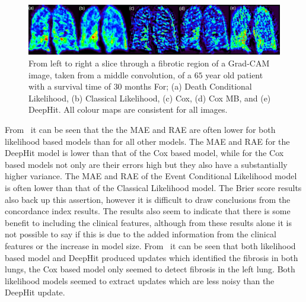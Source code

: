     \begin{figure}
        
        \centering

        \includegraphics[width=1.0\linewidth]{Figures/grad_cam_label.png}
        
        \vspace{-0.25cm}
        
        \captionsetup{singlelinecheck=false, justification=centering}
        \caption{
            \scriptsize
            From left to right a slice through a fibrotic region of a Grad-CAM image, taken from a middle convolution, of a $65$ year old patient with a survival time of $30$ months For; (a) Death Conditional Likelihood, (b) Classical Likelihood, (c) Cox, (d) Cox \gls{MB}, and (e) DeepHit. All colour maps are consistent for all images.
        }
        \label{fig:grad_cam}
        
       \vspace{-0.5cm}
   \end{figure}

    From~ it can be seen that the the \gls{MAE} and \gls{RAE} are often lower for both likelihood based models than for all other models. The \gls{MAE} and \gls{RAE} for the DeepHit model is lower than that of the Cox based model, while for the Cox based models not only are their errors high but they also have a substantially higher variance. The \gls{MAE} and \gls{RAE} of the Event Conditional Likelihood model is often lower than that of the Classical Likelihood model. The Brier score results also back up this assertion, however it is difficult to draw conclusions from the concordance index results. The results also seem to indicate that there is some benefit to including the clinical features, although from these results alone it is not possible to say if this is due to the added information from the clinical features or the increase in model size. From~ it can be seen that both likelihood based model and DeepHit produced updates which identified the fibrosis in both lungs, the Cox based model only seemed to detect fibrosis in the left lung. Both likelihood models seemed to extract updates which are less noisy than the DeepHit update.
